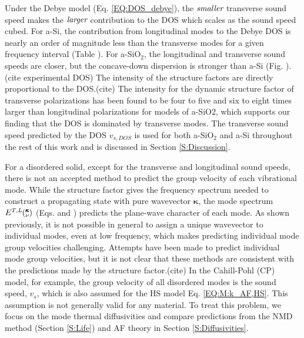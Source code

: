 \documentclass[aps,prb,twocolumn,superscriptaddress,footinbib,amsmath,amssymb,floatfix]{revtex4}
\newcommand{\kv}{\mspace{-4.0mu}\left(\mspace{-8.0mu}
\begin{smallmatrix}&\pmb{\kappa} \\&\nu\end{smallmatrix}
\mspace{-3.0mu}\right)}
\begin{document}
Under the Debye model (Eq. \eqref{EQ:DOS_debye}), 
the $\emph{smaller}$ transverse sound speed 
makes the $\emph{larger}$ contribution to the DOS which scales 
as the sound speed cubed. For a-Si, 
the contribution from longitudinal modes to the Debye DOS is nearly 
an order of magnitude less than the transverse modes for a given 
frequency interval (Table ). For a-SiO$_2$, the longitudinal and 
transverse sound speeds are closer, but the concave-down dispersion 
is stronger than a-Si (Fig. ).(cite experimental DOS) 
The intensity of the structure factors  
are directly proportional to the DOS.(cite)
The intensity for the dynamic structure factor of transverse 
polarizations has been found to be four to five\cite{taraskin_phonons_1997} 
and six to eight\cite{horbach_high_2001} times larger than longitudinal 
polarizations for models 
of a-SiO2, which supports our finding that the DOS is dominated 
by transverse modes. 
The transverse sound speed predicted by the DOS $v_{s,DOS}$ is used for both 
a-SiO$_2$ and a-Si throughout the rest of this work and is discussed 
in Section \ref{S:Discussion}.

For a disordered solid, 
except for the transverse and longitudinal sound speeds, there is not an 
accepted method to predict the group velocity of each  
vibrational mode. 
While the structure factor gives the frequency spectrum needed to 
construct a propagating state with pure wavevector $\pmb{\kappa}$, 
the mode spectrum $E^{T,L}\kv$ (Eqs. and ) predicts the plane-wave 
character of each mode. As shown previously, it is not possible 
in general 
to assign a unique wavevector to individual modes, even at low frequency,
\cite{biswas_vibrational_1988,feldman_thermal_1993,silbert_normal_2009} 
which makes predicting individual mode group velocities challenging. 
Attempts have been made to predict individual mode group velocities,
\cite{cahill_lattice_1988,duda_reducing_2011,donadio_atomistic_2009,
he_heat_2011,he_thermal_2011,hori_phonon_2013} 
but 
it is not clear that these methods are consistent with the predictions 
made by the structure factor.(cite) 
In the Cahill-Pohl (CP) model, for example, the group velocity of 
all disordered modes is the sound speed, $v_s$, which is also assumed  
for the HS model Eq. \eqref{EQ:M:k_AF,HS}.
\cite{cahill_lattice_1988} This assumption is not generally valid  
for any material.\cite{feldman_numerical_1999,duda_reducing_2011,
donadio_atomistic_2009,he_heat_2011,he_thermal_2011,larkin_predicting_2013}
To treat this problem, we focus on the mode thermal diffusivities 
and compare predictions from the 
NMD method (Section \ref{S:Life}) and AF theory in 
Section \ref{S:Diffusivities}.
\end{document}
